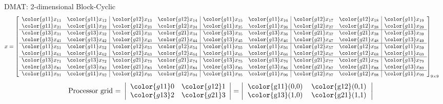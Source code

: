 \begin{frame}[shrink]
\begin{exampleblock}{DMAT: 2-dimensional Block-Cyclic}
\begin{align*}
x &= \left[
      \begin{array}{ll|ll|ll|ll|l}
      \color{g11}x_{11} & \color{g11}x_{12} & \color{g12}x_{13} & \color{g12}x_{14} & \color{g11}x_{15} & \color{g11}x_{16} & \color{g12}x_{17} & \color{g12}x_{18} & \color{g11}x_{19}\\
      \color{g11}x_{21} & \color{g11}x_{22} & \color{g12}x_{23} & \color{g12}x_{24} & \color{g11}x_{25} & \color{g11}x_{26} & \color{g12}x_{27} & \color{g12}x_{28} & \color{g11}x_{29}\\\hline
      \color{g13}x_{31} & \color{g13}x_{32} & \color{g21}x_{33} & \color{g21}x_{34} & \color{g13}x_{35} & \color{g13}x_{36} & \color{g21}x_{37} & \color{g21}x_{38} & \color{g13}x_{39}\\
      \color{g13}x_{41} & \color{g13}x_{42} & \color{g21}x_{43} & \color{g21}x_{44} & \color{g13}x_{45} & \color{g13}x_{46} & \color{g21}x_{47} & \color{g21}x_{48} & \color{g13}x_{49}\\\hline
      \color{g11}x_{51} & \color{g11}x_{52} & \color{g12}x_{53} & \color{g12}x_{54} & \color{g11}x_{55} & \color{g11}x_{56} & \color{g12}x_{57} & \color{g12}x_{58} & \color{g11}x_{59}\\
      \color{g11}x_{61} & \color{g11}x_{62} & \color{g12}x_{63} & \color{g12}x_{64} & \color{g11}x_{65} & \color{g11}x_{66} & \color{g12}x_{67} & \color{g12}x_{68} & \color{g11}x_{69}\\\hline
      \color{g13}x_{71} & \color{g13}x_{72} & \color{g21}x_{73} & \color{g21}x_{74} & \color{g13}x_{75} & \color{g13}x_{76} & \color{g21}x_{77} & \color{g21}x_{78} & \color{g13}x_{79}\\
      \color{g13}x_{81} & \color{g13}x_{82} & \color{g21}x_{83} & \color{g21}x_{84} & \color{g13}x_{85} & \color{g13}x_{86} & \color{g21}x_{87} & \color{g21}x_{88} & \color{g13}x_{89}\\\hline
      \color{g11}x_{91} & \color{g11}x_{92} & \color{g12}x_{93} & \color{g12}x_{94} & \color{g11}x_{95} & \color{g11}x_{96} & \color{g12}x_{97} & \color{g12}x_{98} & \color{g11}x_{99}\\
      \end{array}
\right]_{9\times 9}
\end{align*}
\begin{align*}
\text{Processor grid = }\left|
      \begin{array}{ll}
      \color{g11}0 & \color{g12}1 \\
      \color{g13}2 & \color{g21}3
      \end{array}
\right| &= 
\left|
      \begin{tabular}{lll}
      \color{g11}(0,0) & \color{g12}(0,1) \\
      \color{g13}(1,0) & \color{g21}(1,1) 
      \end{tabular}
\right|
\end{align*}
\end{exampleblock}
\end{frame}



